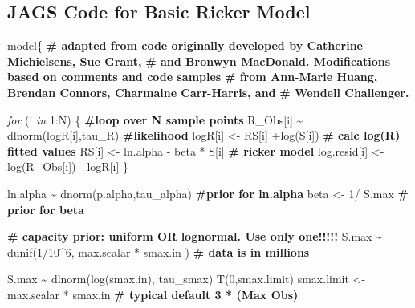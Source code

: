 \documentclass[french,11pt]{book}
\newenvironment{Shaded}{\begin{snugshade}}{\end{snugshade}}
\newcommand{\CommentTok}[1]{\textcolor[rgb]{0.56,0.35,0.01}{\textbf{#1}}}
\newcommand{\ControlFlowTok}[1]{\textcolor[rgb]{0.13,0.29,0.53}{\textit{#1}}}
\newcommand{\DecValTok}[1]{\textcolor[rgb]{0.00,0.00,0.81}{#1}}
\newcommand{\FunctionTok}[1]{\textcolor[rgb]{0.00,0.00,0.00}{#1}}
\newcommand{\NormalTok}[1]{#1}
\newcommand{\OtherTok}[1]{\textcolor[rgb]{0.56,0.35,0.01}{#1}}
\newcommand{\SpecialCharTok}[1]{\textcolor[rgb]{0.00,0.00,0.00}{#1}}
\begin{document}
\label{jags-code-for-single-stock-sr-model-fits}

\subsection{JAGS Code for Basic Ricker Model}\label{jags-code-for-basic-ricker-model}
\begin{Shaded}
\begin{Highlighting}[]
\NormalTok{model\{}
    \CommentTok{\# adapted from code originally developed by Catherine Michielsens, Sue Grant, }
    \CommentTok{\# and Bronwyn MacDonald. Modifications based on comments and code samples }
    \CommentTok{\# from Ann{-}Marie Huang, Brendan Connors, Charmaine Carr{-}Harris, and }
    \CommentTok{\# Wendell Challenger.}

    \ControlFlowTok{for}\NormalTok{ (i }\ControlFlowTok{in} \DecValTok{1}\SpecialCharTok{:}\NormalTok{N) \{                }\CommentTok{\#loop over N sample points}
\NormalTok{      R\_Obs[i] }\SpecialCharTok{\textasciitilde{}} \FunctionTok{dlnorm}\NormalTok{(logR[i],tau\_R)    }\CommentTok{\#likelihood }
\NormalTok{      logR[i] }\OtherTok{\textless{}{-}}\NormalTok{ RS[i] }\SpecialCharTok{+}\FunctionTok{log}\NormalTok{(S[i])         }\CommentTok{\# calc log(R) fitted values}
\NormalTok{       RS[i] }\OtherTok{\textless{}{-}}\NormalTok{ ln.alpha }\SpecialCharTok{{-}}\NormalTok{ beta }\SpecialCharTok{*}\NormalTok{ S[i]     }\CommentTok{\# ricker model}
\NormalTok{      log.resid[i] }\OtherTok{\textless{}{-}}  \FunctionTok{log}\NormalTok{(R\_Obs[i]) }\SpecialCharTok{{-}}\NormalTok{ logR[i] }
\NormalTok{   \}}

\NormalTok{    ln.alpha }\SpecialCharTok{\textasciitilde{}} \FunctionTok{dnorm}\NormalTok{(p.alpha,tau\_alpha)  }\CommentTok{\#prior for ln.alpha }
\NormalTok{    beta }\OtherTok{\textless{}{-}} \DecValTok{1}\SpecialCharTok{/}\NormalTok{ S.max                     }\CommentTok{\# prior for beta}

   \CommentTok{\# capacity prior: uniform OR lognormal. Use only one!!!!!}
\NormalTok{   S.max }\SpecialCharTok{\textasciitilde{}} \FunctionTok{dunif}\NormalTok{(}\DecValTok{1}\SpecialCharTok{/}\DecValTok{10}\SpecialCharTok{\^{}}\DecValTok{6}\NormalTok{, max.scalar }\SpecialCharTok{*}\NormalTok{ smax.in )  }\CommentTok{\# data is in millions}
   
\NormalTok{   S.max }\SpecialCharTok{\textasciitilde{}} \FunctionTok{dlnorm}\NormalTok{(}\FunctionTok{log}\NormalTok{(smax.in), tau\_smax) }\FunctionTok{T}\NormalTok{(}\DecValTok{0}\NormalTok{,smax.limit)}
\NormalTok{    smax.limit }\OtherTok{\textless{}{-}}\NormalTok{ max.scalar }\SpecialCharTok{*}\NormalTok{ smax.in }\CommentTok{\# typical default  3 * (Max Obs)}
    

\end{Highlighting}
\end{Shaded}
\end{document}
